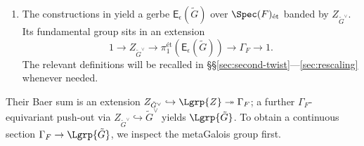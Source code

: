 \documentclass[a4paper,10pt]{article}
\begin{document}
\begin{enumerate}
	\item The constructions in \cite[\S 3.2]{Weis17} yield a gerbe $\mathsf{E}_\epsilon(\tilde{G})$ over $\Spec(F)_{\text{ét}}$ banded by $Z_{\tilde{G}^\vee}$. Its fundamental group sits in an extension
	\begin{equation}\label{eqn:gerbe-pi1}
		1 \to Z_{\tilde{G}^\vee} \to \pi_1^{\text{ét}}(\mathsf{E}_\epsilon(\tilde{G})) \to \Gamma_F \to 1.
	\end{equation}
	The relevant definitions will be recalled in \S\S\ref{sec:second-twist}---\ref{sec:rescaling} whenever needed.
\end{enumerate}
Their Baer sum is an extension $Z_{\tilde{G}^\vee} \hookrightarrow \Lgrp{Z} \twoheadrightarrow \Gamma_F$; a further $\Gamma_F$-equivariant push-out via $Z_{\tilde{G}^\vee} \hookrightarrow \tilde{G}^\vee$ yields $\Lgrp{\tilde{G}}$. To obtain a continuous section $\Gamma_F \to \Lgrp{\tilde{G}}$, we inspect the metaGalois group first.
\end{document}
